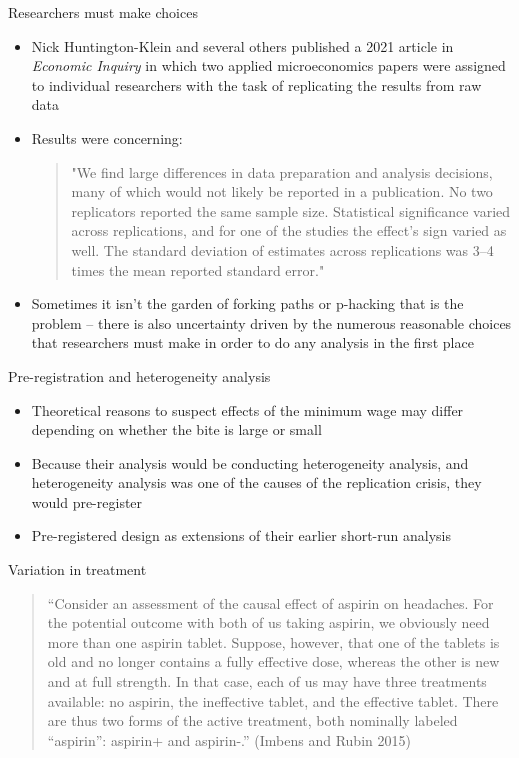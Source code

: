 \documentclass{beamer}
\begin{document}
\begin{frame}{Researchers must make choices}

\begin{itemize}
\item Nick Huntington-Klein and several others published a 2021 article in \emph{Economic Inquiry} in which two applied microeconomics papers were assigned to individual researchers with the task of replicating the results from raw data
\item Results were concerning: 
\begin{quote}
"We find large differences in data preparation and analysis decisions, many of which would not likely be reported in a publication. No two replicators reported the same sample size. Statistical significance varied across replications, and for one of the studies the effect's sign varied as well. The standard deviation of estimates across replications was 3–4 times the mean reported standard error."
\end{quote}
\item Sometimes it isn't the garden of forking paths or p-hacking that is the problem -- there is also uncertainty driven by the numerous reasonable choices that researchers must make in order to do any analysis in the first place
\end{itemize}

\end{frame}


\begin{frame}{Pre-registration and heterogeneity analysis}

\begin{itemize}
\item Theoretical reasons to suspect effects of the minimum wage may differ depending on whether the bite is large or small
\item Because their analysis would be conducting heterogeneity analysis, and heterogeneity analysis was one of the causes of the replication crisis, they would pre-register
\item Pre-registered design as extensions of their earlier short-run analysis
\end{itemize}

\end{frame}




\begin{frame}{Variation in treatment}


\begin{quote}
``Consider an assessment of the causal effect of aspirin on headaches. For the potential outcome with both of us taking aspirin, we obviously need more than one aspirin tablet.  Suppose, however, that one of the tablets is old and no longer contains a fully effective dose, whereas the other is new and at full strength.  In that case, each of us may have three treatments available: no aspirin, the ineffective tablet, and the effective tablet.  There are thus two forms of the active treatment, both nominally labeled ``aspirin'': aspirin+ and aspirin-.'' (Imbens and Rubin 2015)
\end{quote}

\end{frame}
\end{document}
